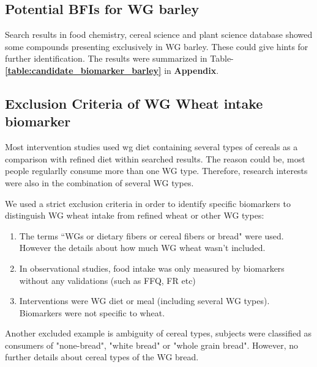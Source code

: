 \subsection{Potential BFIs for WG barley}
Search results in food chemistry, cereal science and plant science database showed some compounds presenting exclusively in WG barley. These could give hints for further identification. The results were summarized in Table-\textbf{\ref{table:candidate_biomarker_barley}} in \textbf{Appendix}.


\subsection{Exclusion Criteria of WG Wheat intake biomarker}
Most intervention studies used \acrshort{wg} diet containing several types of cereals as a comparison with refined diet within searched results. The reason could be, most people regularlly consume more than one WG type. Therefore, research interests were also in the combination of several WG types. 

We used a strict exclusion criteria in order to identify specific biomarkers to distinguish WG wheat intake from refined wheat or other WG types:
\begin{enumerate}
	\item The terms ``WGs or dietary fibers or cereal fibers or bread" were used. However the details about how much WG wheat wasn't included.
	\item In observational studies, food intake was only measured by biomarkers without any validations (such as FFQ, FR etc)
	\item Interventions were WG diet or meal (including several WG types). Biomarkers were not specific to wheat.
\end{enumerate}



Another excluded example is ambiguity of cereal types\cite{ISI:000348343300015}, subjects were classified as consumers of "none-bread", "white bread" or "whole grain bread". However, no further details about cereal types of the WG bread.

